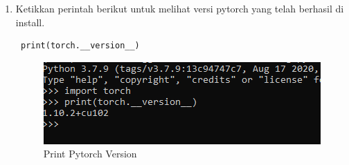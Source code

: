 \begin{enumerate}
\item Ketikkan perintah berikut untuk melihat versi pytorch yang telah berhasil di install.
\begin{verbatim}
 print(torch.__version__)
\end{verbatim}
\begin{figure}[H]
\centering
\includegraphics[scale=.5]{figures/pytorch13}
\caption{Print Pytorch Version}
\label{pytorch13}
\end{figure}

\end{enumerate}

